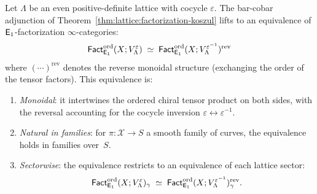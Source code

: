 \begin{theorem}
\label{thm:lattice:homotopy-factorization-dk}
Let $\Lambda$ be an even positive-definite lattice with cocycle
$\varepsilon$.  The bar-cobar adjunction of
Theorem~\textup{\ref{thm:lattice:factorization-koszul}} lifts to an
equivalence of $\mathsf{E}_1$-factorization $\infty$-categories:
\begin{equation}\label{eq:lattice:homotopy-fact-dk}
\mathsf{Fact}_{\mathsf{E}_1}^{\mathrm{ord}}(X; V_\Lambda^\varepsilon)
\;\simeq\;
\mathsf{Fact}_{\mathsf{E}_1}^{\mathrm{ord}}(X; V_\Lambda^{\varepsilon^{-1}})^{\mathrm{rev}}
\end{equation}
where $(\cdots)^{\mathrm{rev}}$ denotes the reverse monoidal
structure \textup{(}exchanging the order of the tensor factors\textup{)}.
This equivalence is:
\begin{enumerate}[label=(\roman*)]
\item \emph{Monoidal}: it intertwines the ordered chiral tensor
  product on both sides, with the reversal accounting for the
  cocycle inversion $\varepsilon \leftrightarrow \varepsilon^{-1}$.
\item \emph{Natural in families}: for $\pi\colon \mathcal{X} \to S$
  a smooth family of curves, the equivalence holds in families
  over~$S$.
\item \emph{Sectorwise}: the equivalence restricts to an equivalence
  of each lattice sector:
  \[
  \mathsf{Fact}_{\mathsf{E}_1}^{\mathrm{ord}}(X; V_\Lambda^\varepsilon)_\gamma
  \;\simeq\;
  \mathsf{Fact}_{\mathsf{E}_1}^{\mathrm{ord}}(X; V_\Lambda^{\varepsilon^{-1}})_\gamma^{\mathrm{rev}}.
  \]
\end{enumerate}
\end{theorem}

